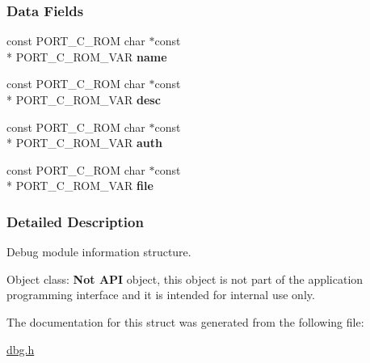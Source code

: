 \subsubsection*{Data Fields}
\begin{DoxyCompactItemize}
\item 
\hypertarget{structdbgModInfo_aa930e11973d9d0e95ad4e2194953c2da}{const P\-O\-R\-T\-\_\-\-C\-\_\-\-R\-O\-M char $\ast$const \\*
P\-O\-R\-T\-\_\-\-C\-\_\-\-R\-O\-M\-\_\-\-V\-A\-R {\bfseries name}}\label{structdbgModInfo_aa930e11973d9d0e95ad4e2194953c2da}

\item 
\hypertarget{structdbgModInfo_a3feb1e0b48cf87cba28225979dc351b3}{const P\-O\-R\-T\-\_\-\-C\-\_\-\-R\-O\-M char $\ast$const \\*
P\-O\-R\-T\-\_\-\-C\-\_\-\-R\-O\-M\-\_\-\-V\-A\-R {\bfseries desc}}\label{structdbgModInfo_a3feb1e0b48cf87cba28225979dc351b3}

\item 
\hypertarget{structdbgModInfo_a3566e0ebeba269f90c360e1aac34ecb8}{const P\-O\-R\-T\-\_\-\-C\-\_\-\-R\-O\-M char $\ast$const \\*
P\-O\-R\-T\-\_\-\-C\-\_\-\-R\-O\-M\-\_\-\-V\-A\-R {\bfseries auth}}\label{structdbgModInfo_a3566e0ebeba269f90c360e1aac34ecb8}

\item 
\hypertarget{structdbgModInfo_a5347daf7f1e0988428702e851b3bee54}{const P\-O\-R\-T\-\_\-\-C\-\_\-\-R\-O\-M char $\ast$const \\*
P\-O\-R\-T\-\_\-\-C\-\_\-\-R\-O\-M\-\_\-\-V\-A\-R {\bfseries file}}\label{structdbgModInfo_a5347daf7f1e0988428702e851b3bee54}

\end{DoxyCompactItemize}


\subsubsection{Detailed Description}
Debug module information structure. 

\begin{DoxyParagraph}{Object class\-:}
{\bfseries Not A\-P\-I} object, this object is not part of the application programming interface and it is intended for internal use only. 
\end{DoxyParagraph}


The documentation for this struct was generated from the following file\-:\begin{DoxyCompactItemize}
\item 
\hyperlink{dbg_8h}{dbg.\-h}\end{DoxyCompactItemize}
